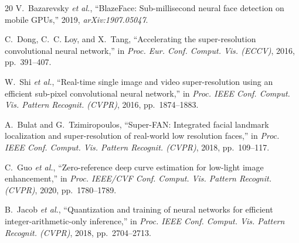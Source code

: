 \documentclass{IEEE_lsens}
\begin{document}
\begin{thebibliography}{20}
V.~Bazarevsky \textit{et al.}, ``BlazeFace: Sub-millisecond neural face detection
on mobile GPUs,'' 2019, \emph{arXiv:1907.05047}.

C.~Dong, C.~C. Loy, and X.~Tang, ``Accelerating the super-resolution
convolutional neural network,'' in \emph{Proc. Eur. Conf. Comput. Vis. (ECCV)},
2016, pp.~391--407.

W.~Shi \textit{et al.}, ``Real-time single image and video super-resolution
using an efficient sub-pixel convolutional neural network,'' in \emph{Proc.
IEEE Conf. Comput. Vis. Pattern Recognit. (CVPR)}, 2016, pp.~1874--1883.

A.~Bulat and G.~Tzimiropoulos, ``Super-FAN: Integrated facial landmark
localization and super-resolution of real-world low resolution faces,'' in
\emph{Proc. IEEE Conf. Comput. Vis. Pattern Recognit. (CVPR)}, 2018,
pp.~109--117.

C.~Guo \textit{et al.}, ``Zero-reference deep curve estimation for low-light
image enhancement,'' in \emph{Proc. IEEE/CVF Conf. Comput. Vis. Pattern
Recognit. (CVPR)}, 2020, pp.~1780--1789.

B.~Jacob \textit{et al.}, ``Quantization and training of neural networks for
efficient integer-arithmetic-only inference,'' in \emph{Proc. IEEE Conf.
Comput. Vis. Pattern Recognit. (CVPR)}, 2018, pp.~2704--2713.

\end{thebibliography}
\end{document}
